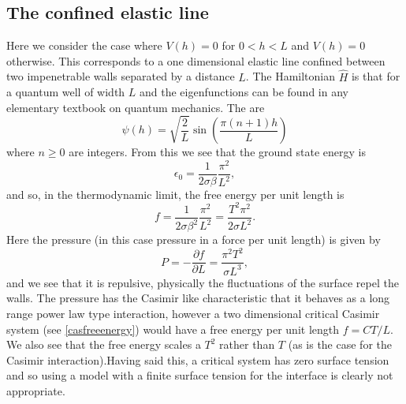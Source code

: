 \subsection{The confined elastic line}
Here we consider the case where $V(h)= 0$ for $0<h<L$ and $V(h)=0$ otherwise. This corresponds to a one dimensional elastic line confined between two impenetrable walls separated by a distance $L$. The Hamiltonian $\hat H$ is that for a quantum well of width $L$ and the eigenfunctions can be found in any elementary textbook on quantum mechanics. The are
\begin{equation}
\psi(h) = \sqrt{\frac{2}{L}}\sin(\frac{\pi(n+1)h}{L})
\end{equation}
where $n\geq 0$ are integers. From this we see that the ground state energy is 
\begin{equation}
\epsilon_0 = \frac{1}{2\sigma\beta}\frac{\pi^2}{L^2},
\end{equation}
and so, in the thermodynamic limit, the free energy per unit length is
\begin{equation}
f = \frac{1}{2\sigma\beta^2}\frac{\pi^2}{L^2}= \frac{T^2\pi^2}{2\sigma L^2}.
\end{equation}
Here the pressure (in this case pressure in a force per unit length) is given by
\begin{equation}
P = -\frac{\partial f}{\partial L} = \frac{\pi^2 T^2}{\sigma L^3},\label{pfree}
\end{equation}
and we see that it is repulsive, physically the fluctuations of the surface repel the walls. 
The pressure has the Casimir like characteristic that it behaves as a long range power law type interaction, however a two dimensional critical Casimir system (see \eqref{casfreeenergy}) would have a free energy per unit length $f=CT/L$. We also see that the free energy scales  a $T^2$ rather than $T$ (as is the case for the Casimir interaction).Having said this, a critical system has zero surface tension and so using a model with a finite
surface tension for the interface is clearly not appropriate.

